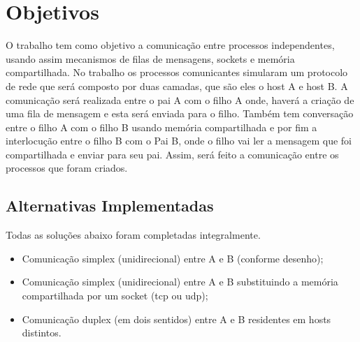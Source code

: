 \chapter{Objetivos}
O trabalho tem como objetivo a comunicação entre processos independentes, usando assim mecanismos de filas de mensagens, sockets e memória compartilhada. No trabalho os processos comunicantes simularam um protocolo de rede que será composto por duas camadas, que são eles o host A e host B.  A comunicação será realizada entre o pai A com o filho A onde, haverá a criação de uma fila de mensagem e esta será enviada para o filho. Também tem conversação entre o filho A com o filho B usando memória compartilhada e por fim a  interlocução entre o filho B com o Pai B, onde o filho vai ler a mensagem que foi compartilhada e enviar para seu pai. Assim, será feito a comunicação entre os processos que foram criados.

\section{Alternativas Implementadas}
Todas as soluções abaixo foram completadas integralmente.

\begin{itemize}
	\item Comunicação simplex (unidirecional) entre A e B (conforme desenho);
	\item Comunicação simplex (unidirecional) entre A e B substituindo a memória compartilhada por um socket (tcp ou udp);
	\item Comunicação duplex (em dois sentidos) entre A e B residentes em hosts distintos.


\end{itemize}

